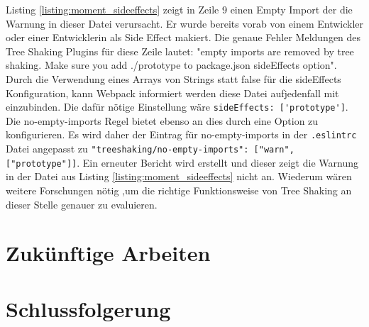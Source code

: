 Listing \ref{listing:moment_sideeffects} zeigt in Zeile 9 einen Empty Import der die Warnung in dieser Datei verursacht. Er wurde bereits vorab von einem Entwickler oder einer Entwicklerin als Side Effect makiert. Die genaue Fehler Meldungen des Tree Shaking Plugins für diese Zeile lautet: "empty imports are removed by tree shaking. Make sure you add ./prototype to package.json sideEffects option". Durch die Verwendung eines Arrays von Strings statt false für die sideEffects Konfiguration, kann Webpack informiert werden diese Datei aufjedenfall mit einzubinden. Die dafür nötige Einstellung wäre \lstinline{sideEffects: ['prototype']}. Die no-empty-imports Regel bietet ebenso an dies durch eine Option zu konfigurieren. Es wird daher der Eintrag für no-empty-imports in der \lstinline{.eslintrc} Datei angepasst zu \lstinline{"treeshaking/no-empty-imports": ["warn", ["prototype"]]}. Ein erneuter Bericht wird erstellt und dieser zeigt die Warnung in der Datei aus Listing \ref{listing:moment_sideeffects} nicht an. Wiederum wären weitere Forschungen nötig ,um die richtige Funktionsweise von Tree Shaking an dieser Stelle genauer zu evaluieren.

\section{Zukünftige Arbeiten}

\section{Schlussfolgerung}

